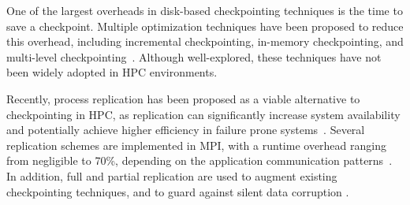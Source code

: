 One of the largest overheads in disk-based checkpointing techniques is the time to save a checkpoint. %
Multiple optimization techniques have been proposed to reduce this overhead, including incremental checkpointing, in-memory checkpointing, and multi-level checkpointing~\cite{Gao:2015:RIC:2751205.2751212,Agarwal:04:Adaptive,zheng2004ftc,Moody:10:SCR}.
 Although well-explored, these techniques have not been widely adopted
in HPC environments.

Recently, process replication has been proposed as a viable alternative to checkpointing in HPC, as replication can significantly increase system availability and potentially achieve higher efficiency in failure prone systems~\cite{riesen_sandia_2010,Cappello:09:Fault}. Several replication schemes are implemented in MPI, with a runtime overhead ranging from negligible to 70\%, depending on the application communication patterns~\cite{engelmann2011redundant,ferreira_sc_2011}.
In addition, full and partial replication are used to augment existing checkpointing techniques, and to guard
against silent data corruption \cite{elliott_2012_cpr,ni_2013_acr,fiala_2012_sdc}.


